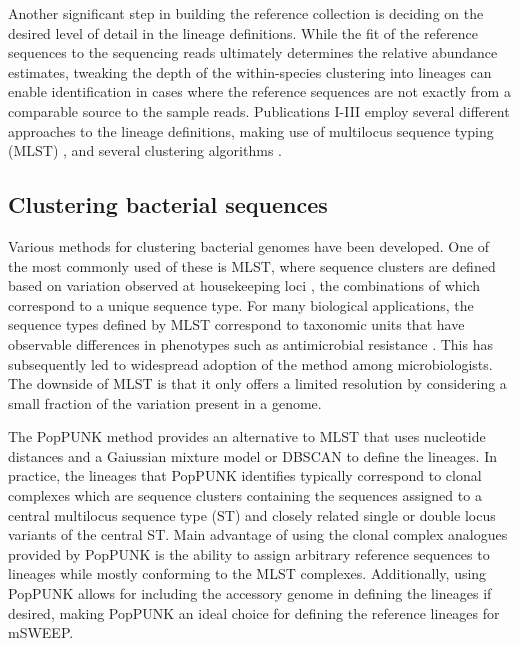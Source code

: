 \documentclass[officiallayout]{tktla}
\begin{document}
Another significant step in building the reference collection is
deciding on the desired level of detail in the lineage
definitions. While the fit of the reference sequences to the
sequencing reads ultimately determines the relative abundance
estimates, tweaking the depth of the within-species clustering into
lineages can enable identification in cases where the reference
sequences are not exactly from a comparable source to the sample
reads. Publications I-III employ several different approaches to the
lineage definitions, making use of multilocus sequence typing (MLST)
\citep{enright1999multilocus}, and several clustering algorithms
\citep{lees2019fast, cheng2013hierarchical, corander2006bayesian}.

\subsection{Clustering bacterial sequences}

Various methods for clustering bacterial genomes have been
developed. One of the most commonly used of these is MLST, where
sequence clusters are defined based on variation observed at
housekeeping loci \citep{enright1999multilocus}, the combinations of
which correspond to a unique sequence type. For many biological
applications, the sequence types defined by MLST correspond to
taxonomic units that have observable differences in phenotypes such as
antimicrobial resistance \citep{kallonen2017systematic,
  shaik2017comparative}. This has subsequently led to widespread
adoption of the method among microbiologists. The
downside of MLST is that it only offers a limited resolution by
considering a small fraction of the variation present in a genome.

The PopPUNK method \citep{lees2019fast} provides an alternative to
MLST that uses nucleotide distances and a Gaiussian
mixture model or DBSCAN \citep{ester1996density} to define the
lineages. In practice, the lineages that PopPUNK identifies typically
correspond to clonal complexes \citep{lees2019fast} which are sequence
clusters containing the sequences assigned to a central multilocus
sequence type (ST) and closely related single or double locus variants
of the central ST. Main advantage of using the clonal complex
analogues provided by PopPUNK is the ability to assign arbitrary
reference sequences to lineages while mostly conforming to the MLST
complexes. Additionally, using PopPUNK allows for including the
accessory genome in defining the lineages if desired, making PopPUNK
an ideal choice for defining the reference lineages for mSWEEP.
\end{document}
